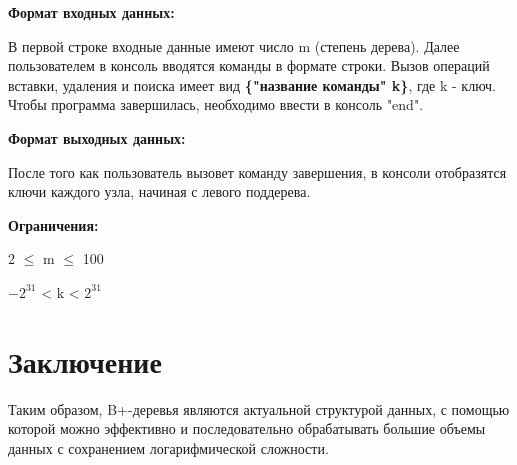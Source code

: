 \documentclass{article}
\begin{document}
\textbf{Формат входных данных:}

В первой строке входные данные имеют число m (степень дерева). Далее пользователем в консоль вводятся команды в формате строки. Вызов операций вставки, удаления и поиска имеет вид \textbf{\{"название команды" \quad k\}}, где k - ключ. Чтобы программа завершилась, необходимо ввести в консоль "end".

\textbf{Формат выходных данных:}

После того как пользователь вызовет команду завершения, в консоли отобразятся ключи каждого узла, начиная с левого поддерева.

\textbf{Ограничения:}

2 $\leq$ m $\leq$ 100

$-2^{31}$ < k < $2^{31}$
\section{Заключение}

Таким образом, B+-деревья являются актуальной структурой данных, с помощью которой можно эффективно и последовательно обрабатывать большие объемы данных с сохранением логарифмической сложности.
\end{document}
